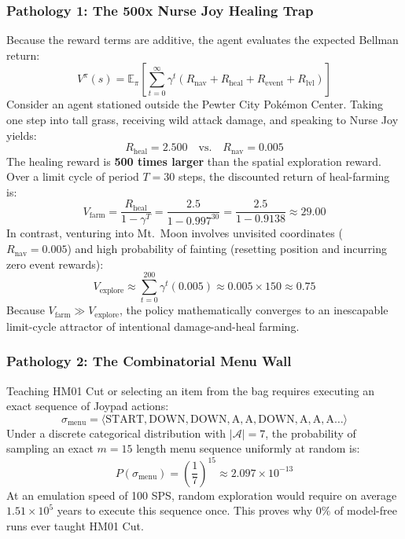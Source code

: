 \documentclass[conference]{IEEEtran}
\begin{document}
\subsubsection{Pathology 1: The 500x Nurse Joy Healing Trap}
Because the reward terms are additive, the agent evaluates the expected Bellman return:
\begin{equation}
V^\pi(s) = \mathbb{E}_\pi \left[ \sum_{t=0}^\infty \gamma^t \left( R_{\text{nav}} + R_{\text{heal}} + R_{\text{event}} + R_{\text{lvl}} \right) \right]
\end{equation}
Consider an agent stationed outside the Pewter City Pok{\'e}mon Center. Taking one step into tall grass, receiving wild attack damage, and speaking to Nurse Joy yields:
\begin{equation}
R_{\text{heal}} = 2.500 \quad \text{vs.} \quad R_{\text{nav}} = 0.005
\end{equation}
The healing reward is \textbf{500 times larger} than the spatial exploration reward. Over a limit cycle of period $T = 30$ steps, the discounted return of heal-farming is:
\begin{equation}
V_{\text{farm}} = \frac{R_{\text{heal}}}{1 - \gamma^T} = \frac{2.5}{1 - 0.997^{30}} = \frac{2.5}{1 - 0.9138} \approx 29.00
\end{equation}
In contrast, venturing into Mt.~Moon involves unvisited coordinates ($R_{\text{nav}} = 0.005$) and high probability of fainting (resetting position and incurring zero event rewards):
\begin{equation}
V_{\text{explore}} \approx \sum_{t=0}^{200} \gamma^t (0.005) \approx 0.005 \times 150 \approx 0.75
\end{equation}
Because $V_{\text{farm}} \gg V_{\text{explore}}$, the policy mathematically converges to an inescapable limit-cycle attractor of intentional damage-and-heal farming.

\subsubsection{Pathology 2: The Combinatorial Menu Wall}
Teaching HM01 Cut or selecting an item from the bag requires executing an exact sequence of Joypad actions:
\begin{equation}
\sigma_{\text{menu}} = \langle \text{START}, \text{DOWN}, \text{DOWN}, \text{A}, \text{A}, \text{DOWN}, \text{A}, \text{A}, \text{A} \dots \rangle
\end{equation}
Under a discrete categorical distribution with $|\mathcal{A}| = 7$, the probability of sampling an exact $m=15$ length menu sequence uniformly at random is:
\begin{equation}
P(\sigma_{\text{menu}}) = \left( \frac{1}{7} \right)^{15} \approx 2.097 \times 10^{-13}
\end{equation}
At an emulation speed of 100 SPS, random exploration would require on average $1.51 \times 10^5$ years to execute this sequence once. This proves why $0\%$ of model-free runs ever taught HM01 Cut.
\end{document}
